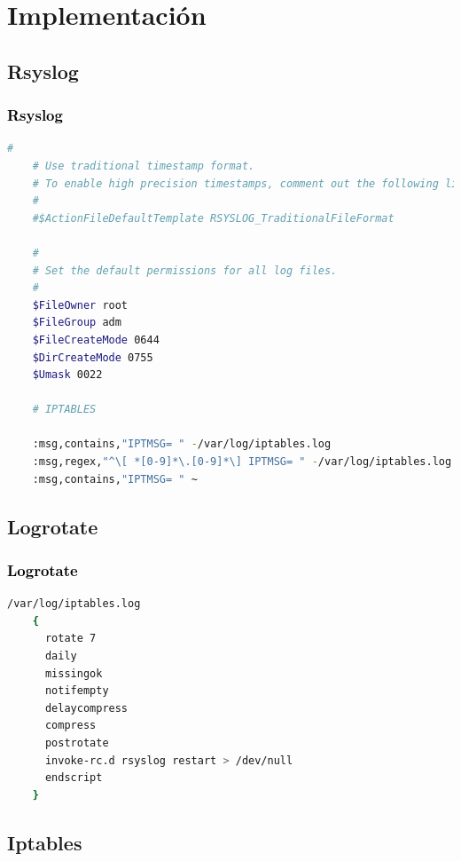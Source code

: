 \documentclass[xcolor=x11names,compress]{beamer}
\theoremstyle{cuadrado}
\begin{document}
{{}

\section{Implementación}

\subsection{Rsyslog}
\begin{frame}[fragile]
  \frametitle{\textcolor{black}{Rsyslog}}

  \begin{lstlisting}[language=bash]
    #
    # Use traditional timestamp format.
    # To enable high precision timestamps, comment out the following line.
    #
    #$ActionFileDefaultTemplate RSYSLOG_TraditionalFileFormat

    #
    # Set the default permissions for all log files.
    #
    $FileOwner root
    $FileGroup adm
    $FileCreateMode 0644
    $DirCreateMode 0755
    $Umask 0022

    # IPTABLES

    :msg,contains,"IPTMSG= " -/var/log/iptables.log
    :msg,regex,"^\[ *[0-9]*\.[0-9]*\] IPTMSG= " -/var/log/iptables.log
    :msg,contains,"IPTMSG= " ~

  \end{lstlisting}
  
  \hspace*{1in}{Figura - Configuración de iptables para Rsyslog}
\end{frame}

\subsection{Logrotate}

\begin{frame}[fragile]
  \frametitle{\textcolor{black}{Logrotate}}

  \begin{lstlisting}[language=bash]
    /var/log/iptables.log
    {
      rotate 7
      daily
      missingok
      notifempty
      delaycompress
      compress
      postrotate
      invoke-rc.d rsyslog restart > /dev/null
      endscript
    }
  \end{lstlisting}
  \hspace*{1in}{Figura - Configuración de iptables para Logrotate}
\end{frame}

\subsection{Iptables}

}
\end{document}
